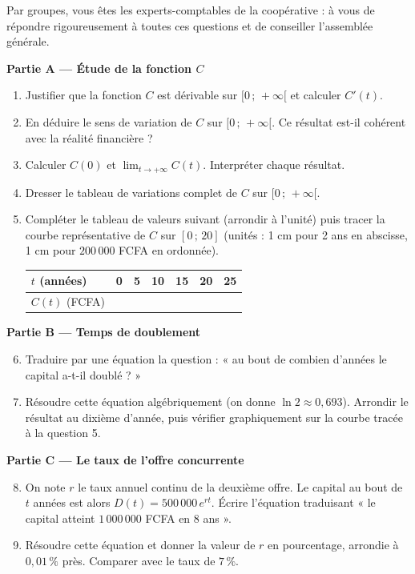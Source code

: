 \documentclass[11pt]{article}
\newcounter{popsec}
\newcounter{popsub}
\newcommand{\courssub}[1]{%
  \stepcounter{popsub}%
  \par\vspace{9pt}\noindent{\popxbold\fontsize{11.5}{13}\selectfont\color{popink}{\color{poporange}\thepopsec.\thepopsub}\hspace{6pt}#1}\par\nopagebreak\vspace{4pt}
}
\begin{document}
Par groupes, vous êtes les experts-comptables de la coopérative : à vous de répondre rigoureusement à toutes ces questions et de conseiller l'assemblée générale.

\courssub{Consignes}

\textbf{Partie A — Étude de la fonction $C$}

\begin{enumerate}
\item Justifier que la fonction $C$ est dérivable sur $[0\,;\,+\infty[$ et calculer $C'(t)$.
\item En déduire le sens de variation de $C$ sur $[0\,;\,+\infty[$. Ce résultat est-il cohérent avec la réalité financière ?
\item Calculer $C(0)$ et $\displaystyle\lim_{t \to +\infty} C(t)$. Interpréter chaque résultat.
\item Dresser le tableau de variations complet de $C$ sur $[0\,;\,+\infty[$.
\item Compléter le tableau de valeurs suivant (arrondir à l'unité) puis tracer la courbe représentative de $C$ sur $[0\,;\,20]$ (unités : 1 cm pour 2 ans en abscisse, 1 cm pour $200\,000$ FCFA en ordonnée).
\begin{center}
\begin{tabularx}{\linewidth}{|l|X|X|X|X|X|X|}
\hline
\rowcolor{popblueL} $t$ (années) & 0 & 5 & 10 & 15 & 20 & 25 \\
\hline
$C(t)$ (FCFA) & & & & & & \\
\hline
\end{tabularx}
\end{center}
\end{enumerate}

\textbf{Partie B — Temps de doublement}

\begin{enumerate}
\setcounter{enumi}{5}
\item Traduire par une équation la question : « au bout de combien d'années le capital a-t-il doublé ? »
\item Résoudre cette équation algébriquement (on donne $\ln 2 \approx 0,693$). Arrondir le résultat au dixième d'année, puis vérifier graphiquement sur la courbe tracée à la question 5.
\end{enumerate}

\textbf{Partie C — Le taux de l'offre concurrente}

\begin{enumerate}
\setcounter{enumi}{7}
\item On note $r$ le taux annuel continu de la deuxième offre. Le capital au bout de $t$ années est alors $D(t) = 500\,000\,e^{rt}$. Écrire l'équation traduisant « le capital atteint $1\,000\,000$ FCFA en $8$ ans ».
\item Résoudre cette équation et donner la valeur de $r$ en pourcentage, arrondie à $0,01\,\%$ près. Comparer avec le taux de $7\,\%$.
\end{enumerate}
\end{document}
